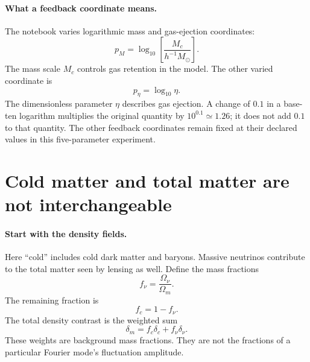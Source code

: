 \documentclass[11pt]{article}
\begin{document}
\paragraph{What a feedback coordinate means.}
The notebook varies logarithmic mass and gas-ejection coordinates:
\begin{equation}
 p_M=\log_{10}\left[\frac{M_c}{h^{-1}M_\odot}\right].
\end{equation}
The mass scale $M_c$ controls gas retention in the model. The other varied
coordinate is
\begin{equation}
 p_\eta=\log_{10}\eta.
\end{equation}
The dimensionless parameter $\eta$ describes gas ejection. A change of
$0.1$ in a base-ten logarithm multiplies the original quantity by
$10^{0.1}\simeq1.26$; it does not add $0.1$ to that quantity. The other
feedback coordinates remain fixed at their declared values in this
five-parameter experiment.

\section{Cold matter and total matter are not interchangeable}
\paragraph{Start with the density fields.}
Here ``cold'' includes cold dark matter and baryons. Massive neutrinos
contribute to the total matter seen by lensing as well. Define the mass
fractions
\begin{equation}
 f_\nu=\frac{\Omega_\nu}{\Omega_m}.
\end{equation}
The remaining fraction is
\begin{equation}
 f_c=1-f_\nu.
\end{equation}
The total density contrast is the weighted sum
\begin{equation}
 \delta_m=f_c\delta_c+f_\nu\delta_\nu.
\end{equation}
These weights are background mass fractions. They are not the fractions
of a particular Fourier mode's fluctuation amplitude.
\end{document}
